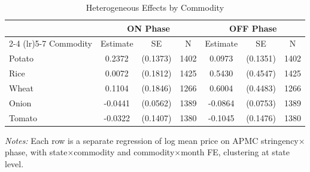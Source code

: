 \begin{table}[htbp]
\centering
\caption{Heterogeneous Effects by Commodity}
\label{tab:heterogeneity}
\begin{tabular}{lcccccc}
\toprule
 & \multicolumn{3}{c}{ON Phase} & \multicolumn{3}{c}{OFF Phase} \\
\cmidrule(lr){2-4} \cmidrule(lr){5-7}
Commodity & Estimate & SE & N & Estimate & SE & N \\
\midrule
Potato & 0.2372 & (0.1373) & 1402 & 0.0973 & (0.1351) & 1402 \\
Rice & 0.0072 & (0.1812) & 1425 & 0.5430 & (0.4547) & 1425 \\
Wheat & 0.1104 & (0.1846) & 1266 & 0.6004 & (0.4483) & 1266 \\
Onion & -0.0441 & (0.0562) & 1389 & -0.0864 & (0.0753) & 1389 \\
Tomato & -0.0322 & (0.1407) & 1380 & -0.1045 & (0.1476) & 1380 \\
\bottomrule
\end{tabular}
\begin{tablenotes}\small
\item \textit{Notes:} Each row is a separate regression of log mean price on APMC stringency$\times$phase,
with state$\times$commodity and commodity$\times$month FE, clustering at state level.
\end{tablenotes}
\end{table}
